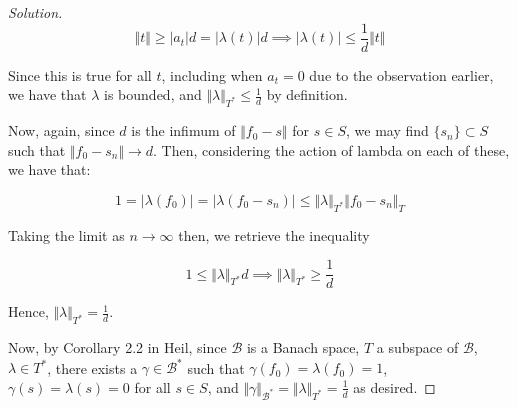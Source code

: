 \documentclass[10pt]{article}
\begin{document}
\begin{proof}[Solution]
$$ \Vert t \Vert \geq |a_t| d = |\lambda(t) | d \implies |\lambda(t)| \leq \frac{1}{d} \Vert t \Vert $$

Since this is true for all $t$, including when $a_t = 0$ due to the observation earlier, we have that $\lambda$ is bounded, and $\Vert \lambda \Vert_{T^*} \leq \frac{1}{d}$ by definition.

Now, again, since $d$ is the infimum of $\Vert f_0 - s \Vert$ for $s \in S$, we may find $\{ s_n \} \subset S$ such that $\Vert f_0 - s_n \Vert \to d$. Then, considering the action of lambda on each of these, we have that:

$$ 1 = | \lambda(f_0) | = | \lambda(f_0 - s_n) |   \leq \Vert \lambda \Vert_{T^*} \Vert f_0 - s_n \Vert_T  $$

Taking the limit as $n \to \infty$ then, we retrieve the inequality

$$ 1 \leq \Vert \lambda \Vert_{T^*} d \implies \Vert \lambda \Vert_{T^*} \geq \frac{1}{d}$$

Hence, $\Vert \lambda \Vert_{T^*} = \frac{1}{d}$.

Now, by Corollary 2.2 in Heil, since $\mathcal{B}$ is a Banach space, $T$ a subspace of $\mathcal{B}$, $\lambda \in T^*$, there exists a $\gamma \in \mathcal{B}^*$ such that $\gamma(f_0) = \lambda(f_0) = 1$, $\gamma(s) = \lambda(s) = 0$ for all $s \in S$, and $\Vert \gamma \Vert_{\mathcal{B}^*} = \Vert \lambda \Vert_{T^*} = \frac{1}{d}$ as desired.
\end{proof}
\end{document}
